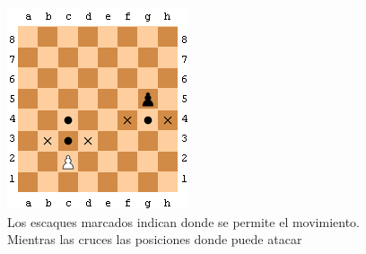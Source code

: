  \begin{figure}[!h]
 	\centering 
 	\includegraphics[scale=0.75]{img/movpeon}
 	\caption{Los escaques marcados indican donde se permite el movimiento. Mientras las cruces las posiciones donde puede atacar}
 	\label{contexto:figurapeon}
 \end{figure}